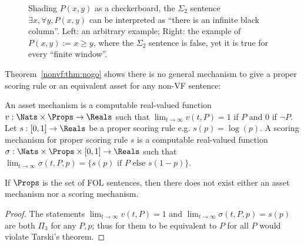 \begin{figure}
    \centering
    \begin{subfigure}{0.45\textwidth}
        \centering
        
        \label{nonvf:fig:checkerboard1}
    \end{subfigure}\hfill%
    \begin{subfigure}{0.45\textwidth}
        \centering
        
        \label{nonvf:fig:checkerboard2}
    \end{subfigure}
    \caption{Shading $P(x,y)$ as a checkerboard, the $\Sigma_2$ sentence $\exists x,\forall y, P(x,y)$ can be interpreted as ``there is an infinite black column''. Left: an arbitrary example; Right: the example of $P(x,y):=x\ge y$, where the $\Sigma_2$ sentence is false, yet it is true for every ``finite window''.}
    \label{nonvf:fig:checkerboard}
\end{figure}

Theorem~\ref{nonvf:thm:nogo} shows there is no general mechanism to give a proper scoring rule or an equivalent asset for any non-VF sentence:

\begin{definition}
  An asset mechanism is a computable real-valued function $v:\Nats\times\Props\to\Reals$ such that $\lim_{t\to\infty}v(t,P)=1$ if $P$ and $0$ if $\lnot P$. Let $s:[0,1]\to\Reals$ be a proper scoring rule e.g. $s(p)=\log(p)$. A scoring mechanism for proper scoring rule $s$ is a computable real-valued function $\sigma:\Nats\times\Props\times[0,1]\to\Reals$ such that $\lim_{t\to\infty}\sigma(t,P,p)=\{s(p)\text{ if }P\text{ else }s(1-p)\}$.
  \label{nonvf:def:mechanisms}
\end{definition}

\begin{theorem}
  If $\Props$ is the set of FOL sentences, then there does not exist either an asset mechanism nor a scoring mechanism.
  \label{nonvf:thm:nogo}
\end{theorem}
\begin{proof}
  The statements $\lim_{t\to\infty}v(t,P)=1$ and $\lim_{t\to\infty}\sigma(t,P,p)=s(p)$ are both $\Pi_3$ for any $P, p$; thus for them to be equivalent to $P$ for all $P$ would violate Tarski's theorem.
\end{proof}

